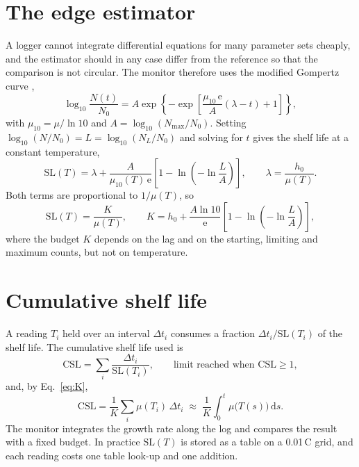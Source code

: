 \documentclass[11pt,a4paper,twoside,openany]{book}
\newcommand{\CSL}{\mathrm{CSL}}
\newcommand{\SL}{\mathrm{SL}}
\newcommand{\dd}{\,\mathrm{d}}
\newcommand{\degC}{\,\textdegree C}
\theoremstyle{plain}\newtheorem{proposition}{Proposition}\newtheorem{corollary}{Corollary}
\theoremstyle{definition}\newtheorem{definition}{Definition}[chapter]
\begin{document}
\section{The edge estimator}
A logger cannot integrate differential equations for many parameter sets cheaply, and the estimator should in any case differ from the reference so that the comparison is not circular. The monitor therefore uses the modified Gompertz curve \cite{zwietering1990},
\begin{equation}\label{eq:gomp}
\log_{10}\frac{N(t)}{N_0}=A\exp\!\left\{-\exp\!\left[\frac{\mu_{10}\,\mathrm{e}}{A}(\lambda-t)+1\right]\right\},
\end{equation}
with $\mu_{10}=\mu/\ln10$ and $A=\log_{10}(N_{\max}/N_0)$. Setting $\log_{10}(N/N_0)=L=\log_{10}(N_L/N_0)$ and solving for $t$ gives the shelf life at a constant temperature,
\begin{equation}\label{eq:sl}
\SL(T) = \lambda + \frac{A}{\mu_{10}(T)\,\mathrm{e}}\left[1-\ln\!\left(-\ln\frac{L}{A}\right)\right],\qquad \lambda=\frac{h_0}{\mu(T)} .
\end{equation}
Both terms are proportional to $1/\mu(T)$, so
\begin{equation}\label{eq:K}
\SL(T)=\frac{K}{\mu(T)},\qquad K=h_0+\frac{A\ln10}{\mathrm{e}}\left[1-\ln\!\left(-\ln\frac{L}{A}\right)\right],
\end{equation}
where the budget $K$ depends on the lag and on the starting, limiting and maximum counts, but not on temperature.

\section{Cumulative shelf life}
A reading $T_i$ held over an interval $\Delta t_i$ consumes a fraction $\Delta t_i/\SL(T_i)$ of the shelf life. The cumulative shelf life used is
\begin{equation}\label{eq:csl}
\CSL = \sum_i \frac{\Delta t_i}{\SL(T_i)}, \qquad \text{limit reached when } \CSL\ge 1,
\end{equation}
and, by Eq.~\eqref{eq:K},
\begin{equation}\label{eq:cslint}
\CSL=\frac{1}{K}\sum_i\mu(T_i)\,\Delta t_i\;\approx\;\frac{1}{K}\int_0^t\mu\big(T(s)\big)\dd s .
\end{equation}
The monitor integrates the growth rate along the log and compares the result with a fixed budget. In practice $\SL(T)$ is stored as a table on a 0.01\degC{} grid, and each reading costs one table look-up and one addition.
\end{document}
